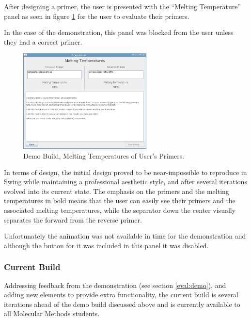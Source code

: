 After designing a primer, the user is presented with the ``Melting
Temperature'' panel as seen in figure \ref{fig:demoBuild:meltingTemp}
for the user to evaluate their primers.

In the case of the demonstration, this panel was blocked from the user
unless they had a correct primer.

\begin{figure}[h]
  \begin{center}
    \includegraphics[width=0.6\textwidth]{./images/demoBuild/meltingTemp.png}
    \caption{
      \label{fig:demoBuild:meltingTemp}
      Demo Build, Melting Temperatures of User's Primers.
    }
  \end{center}
\end{figure}

In terms of design, the initial design proved to be near-impossible to
reproduce in Swing while maintaining a professional aesthetic style, 
and after several iterations evolved into its current state.
The emphasis on the primers and the melting temperatures in bold means
that the user can easily see their primers and the associated melting
temperatures, while the separator down the center visually separates
the forward from the reverse primer.

Unfortunately the animation was not available in time for the
demonstration and although the button for it was included in this
panel it was disabled.


\subsubsection{Current Build}

Addressing feedback from the demonstration (see section \ref{eval:demo}),
and adding new elements to provide extra functionality, the current
build is several iterations ahead of the demo build discussed above
and is currently available to all Molecular Methods students.


